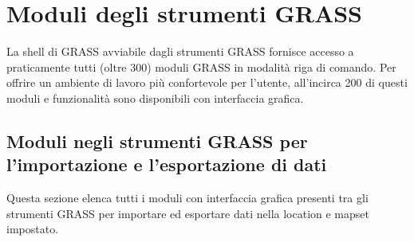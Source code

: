 \section{Moduli degli strumenti GRASS}\label{appdx_grass_toolbox_modules}


La shell di GRASS avviabile dagli strumenti GRASS fornisce accesso a praticamente tutti (oltre 300) moduli GRASS in modalità riga di comando. Per offrire un ambiente di lavoro più confortevole per l'utente, all'incirca 200 di questi moduli e funzionalità sono disponibili con interfaccia grafica.

\subsection{Moduli negli strumenti GRASS per l'importazione e l'esportazione di dati}

Questa sezione elenca tutti i moduli con interfaccia grafica presenti tra gli strumenti GRASS per importare ed esportare dati nella location e mapset impostato.

